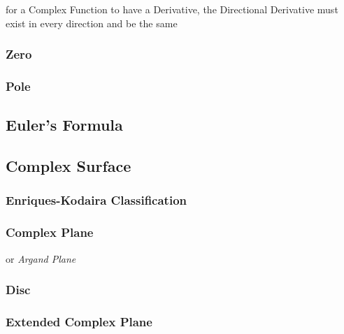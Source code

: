 for a Complex Function to have a Derivative, the Directional Derivative must
exist in every direction and be the same



\subsubsection{Zero}\label{sec:complex_zero}

\subsubsection{Pole}\label{sec:complex_pole}



\subsection{Euler's Formula}\label{sec:eulers_formula}

\subsection{Complex Surface}\label{sec:complex_surface}

\subsubsection{Enriques-Kodaira Classification}
\label{sec:enriques_kodaira}

\subsubsection{Complex Plane}\label{sec:complex_plane}

or \emph{Argand Plane}



\subsubsection{Disc}\label{sec:disc}\hfill

\subsubsection{Extended Complex Plane}\label{sec:extended_complex_plane}

